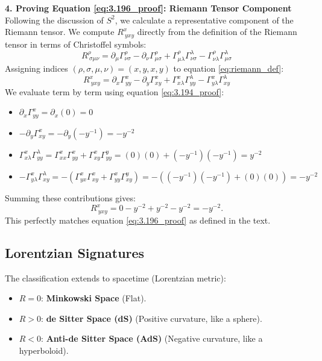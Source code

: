 \documentclass[11pt, a4paper]{report}
\begin{document}
\textbf{4. Proving Equation \eqref{eq:3.196_proof}: Riemann Tensor Component}
Following the discussion of $S^2$, we calculate a representative component of the Riemann tensor. We compute $R^x_{\ yxy}$ directly from the definition of the Riemann tensor in terms of Christoffel symbols:
\begin{equation}
R^\rho_{\ \sigma\mu\nu} = \partial_\mu \Gamma^\rho_{\nu\sigma} - \partial_\nu \Gamma^\rho_{\mu\sigma} + \Gamma^\rho_{\mu\lambda}\Gamma^\lambda_{\nu\sigma} - \Gamma^\rho_{\nu\lambda}\Gamma^\lambda_{\mu\sigma} \label{eq:riemann_def}
\end{equation}
Assigning indices $(\rho, \sigma, \mu, \nu) = (x, y, x, y)$ to equation \eqref{eq:riemann_def}:
\begin{equation}
R^x_{\ yxy} = \partial_x \Gamma^x_{yy} - \partial_y \Gamma^x_{xy} + \Gamma^x_{x\lambda}\Gamma^\lambda_{yy} - \Gamma^x_{y\lambda}\Gamma^\lambda_{xy} \label{eq:riemann_expanded}
\end{equation}
We evaluate term by term using equation \eqref{eq:3.194_proof}:
\begin{itemize}
    \item $\partial_x \Gamma^x_{yy} = \partial_x (0) = 0$
    \item $-\partial_y \Gamma^x_{xy} = -\partial_y (-y^{-1}) = -y^{-2}$
    \item $\Gamma^x_{x\lambda}\Gamma^\lambda_{yy} = \Gamma^x_{xx}\Gamma^x_{yy} + \Gamma^x_{xy}\Gamma^y_{yy} = (0)(0) + (-y^{-1})(-y^{-1}) = y^{-2}$
    \item $-\Gamma^x_{y\lambda}\Gamma^\lambda_{xy} = -(\Gamma^x_{yx}\Gamma^x_{xy} + \Gamma^x_{yy}\Gamma^y_{xy}) = -((-y^{-1})(-y^{-1}) + (0)(0)) = -y^{-2}$
\end{itemize}
Summing these contributions gives:
\begin{equation}
R^x_{\ yxy} = 0 - y^{-2} + y^{-2} - y^{-2} = -y^{-2}. \label{eq:3.196_proof}
\end{equation}
This perfectly matches equation \eqref{eq:3.196_proof} as defined in the text.
\subsection*{Lorentzian Signatures}
The classification extends to spacetime (Lorentzian metric):
\begin{itemize}
    \item $R = 0$: \textbf{Minkowski Space} (Flat).
    \item $R > 0$: \textbf{de Sitter Space (dS)} (Positive curvature, like a sphere).
    \item $R < 0$: \textbf{Anti-de Sitter Space (AdS)} (Negative curvature, like a hyperboloid).
\end{itemize}
\end{document}
